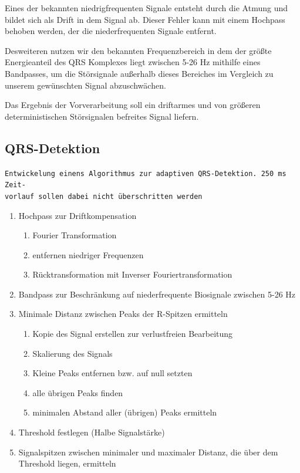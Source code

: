 \documentclass[a4paper,12pt,titlepage]{scrartcl}
\begin{document}
Eines der bekannten niedrigfrequenten Signale entsteht durch die Atmung und bildet sich als Drift in dem Signal ab. Dieser Fehler kann mit einem Hochpass behoben werden, der die niederfrequenten Signale entfernt.

Desweiteren nutzen wir den bekannten Frequenzbereich in dem der größte Energieanteil des QRS Komplexes liegt zwischen 5-26 Hz mithilfe eines Bandpasses, um die Störsignale außerhalb dieses Bereiches im Vergleich zu unserem gewünschten Signal abzuschwächen.

Das Ergebnis der Vorverarbeitung soll ein driftarmes und von größeren deterministischen Störsignalen befreites Signal liefern.

\subsection{QRS-Detektion}
\texttt{Entwickelung einens Algorithmus zur adaptiven QRS-Detektion. 250 ms Zeit-\\vorlauf sollen dabei nicht überschritten werden}

\begin{enumerate}
    \item Hochpass zur Driftkompensation
          \begin{enumerate}
              \item Fourier Transformation
              \item entfernen niedriger Frequenzen
              \item Rücktransformation mit Inverser Fouriertransformation
          \end{enumerate}
    \item Bandpass zur Beschränkung auf niederfrequente Biosignale zwischen 5-26 Hz
    \item Minimale Distanz zwischen Peaks der R-Spitzen ermitteln
          \begin{enumerate}
              \item Kopie des Signal erstellen zur verlustfreien Bearbeitung
              \item Skalierung des Signals
              \item Kleine Peaks entfernen bzw. auf null setzten
              \item alle übrigen Peaks finden
              \item minimalen Abstand aller (übrigen) Peaks ermitteln
          \end{enumerate}
    \item Threshold festlegen (Halbe Signalstärke)
    \item Signalspitzen zwischen minimaler und maximaler Distanz, die über dem Threshold liegen, ermitteln
\end{enumerate}
\end{document}
